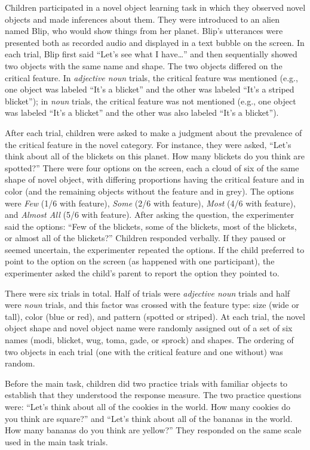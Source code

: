\documentclass{ucetd}
\begin{document}
Children participated in a novel object learning task in which they
observed novel objects and made inferences about them. They were
introduced to an alien named Blip, who would show things from her
planet. Blip's utterances were presented both as recorded audio and
displayed in a text bubble on the screen. In each trial, Blip first said
``Let's see what I have\ldots{}'' and then sequentially showed two
objects with the same name and shape. The two objects differed on the
critical feature. In \emph{adjective noun} trials, the critical feature
was mentioned (e.g., one object was labeled ``It's a blicket'' and the
other was labeled ``It's a striped blicket''); in \emph{noun} trials,
the critical feature was not mentioned (e.g., one object was labeled
``It's a blicket'' and the other was also labeled ``It's a blicket'').

After each trial, children were asked to make a judgment about the
prevalence of the critical feature in the novel category. For instance,
they were asked, ``Let's think about all of the blickets on this planet.
How many blickets do you think are spotted?'' There were four options on
the screen, each a cloud of six of the same shape of novel object, with
differing proportions having the critical feature and in color (and the
remaining objects without the feature and in grey). The options were
\emph{Few} (1/6 with feature), \emph{Some} (2/6 with feature),
\emph{Most} (4/6 with feature), and \emph{Almost All} (5/6 with
feature). After asking the question, the experimenter said the options:
``Few of the blickets, some of the blickets, most of the blickets, or
almost all of the blickets?'' Children responded verbally. If they
paused or seemed uncertain, the experimenter repeated the options. If
the child preferred to point to the option on the screen (as happened
with one participant), the experimenter asked the child's parent to
report the option they pointed to.

There were six trials in total. Half of trials were \emph{adjective
noun} trials and half were \emph{noun} trials, and this factor was
crossed with the feature type: size (wide or tall), color (blue or red),
and pattern (spotted or striped). At each trial, the novel object shape
and novel object name were randomly assigned out of a set of six names
(modi, blicket, wug, toma, gade, or sprock) and shapes. The ordering of
two objects in each trial (one with the critical feature and one
without) was random.

Before the main task, children did two practice trials with familiar
objects to establish that they understood the response measure. The two
practice questions were: ``Let's think about all of the cookies in the
world. How many cookies do you think are square?'' and ``Let's think
about all of the bananas in the world. How many bananas do you think are
yellow?'' They responded on the same scale used in the main task trials.
\end{document}
